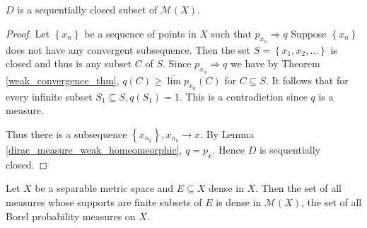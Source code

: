 \begin{lem}
	\( D \) is a sequentially closed subset of \( \mathscr { M } ( X ) \).
\end{lem}

\begin{proof}
	Let \( \left\{ x _ { n } \right\} \) be a sequence of points in \( X \) such that \( p _ { x _ { n } } \Rightarrow q \) Suppose \( \left\{ x _ { n } \right\} \) does not have any convergent subsequence. Then the set \( S = \left\{ x _ { 1 } , x _ { 2 } , \ldots \right\} \) is closed and thus is any subset \( C \) of \( S . \) Since \( p _ { x _ { n } } \Rightarrow q \) we have by Theorem \ref{weak_convergence_thm}, \( q ( C ) \geqslant \overline { \lim } p _ { x _ { n } } ( C ) \) for \( C \subseteq S \). It follows that for every infinite subset \( S _ { 1 } \subseteq S , q \left( S _ { 1 } \right) = 1 \). This is a contradiction since \( q \) is a measure.

	Thus there is a subsequence \( \left\{ x _ { n _ { k } } \right\} , x _ { n _ { k } } \rightarrow x . \) By Lemma \ref{dirac_measure_weak_homeomeorphic}, \( q = p _ { x } \). Hence \( D \) is sequentially closed.
\end{proof}


\begin{thm}
	\label{finite_support_approximation}
	Let \( X \) be a separable metric space and \( E \subseteq X \) dense in \( X  \). Then the set of all measures whose supports are finite subsets of \( E \) is dense in \( \mathscr{ M } ( X ) \), the set of all Borel probability measures on $X$.
\end{thm}

